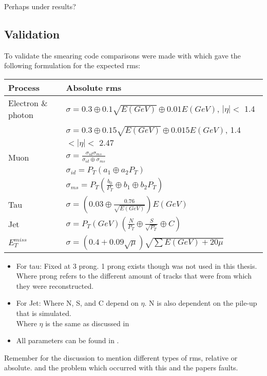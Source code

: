 Perhaps under results?
\subsection{Validation}
To validate the smearing code comparisons were made with \citep{ATL-PHYS-PUB-2013-004} which gave the following formulation for the expected rms: 
\begin{table}[h]
\renewcommand{\arraystretch}{1.5} %
\begin{tabular}{|l|l|}
\hline
Process & Absolute rms \\ \hline
Electron \& photon & $\sigma=0.3\oplus 0.1\sqrt{E(GeV)}\oplus 0.01E(GeV)$, $|\eta|<$ 1.4 \\
& $\sigma=0.3\oplus 0.15\sqrt{E(GeV)}\oplus 0.015E(GeV)$, 1.4 $<|\eta|<$ 2.47 \\ \hline 
Muon & $\sigma=\frac{\sigma_{id} \sigma_{ms}}{\sigma_{id} \oplus \sigma_{ms}}$\\
& $\sigma_{id}=P_T(a_1 \oplus a_2 P_T)$\\
& $\sigma_{ms}=P_T(\frac{b_0}{P_T} \oplus b_1 \oplus b_2 P_T)$\\ \hline
Tau & $\sigma =(0.03\oplus \frac{0.76}{\sqrt{E(GeV)}})E(GeV)$ \\ \hline
Jet & $\sigma = P_T(GeV)(\frac{N}{P_T} \oplus \frac{S}{\sqrt{P_T}} \oplus C)$ \\ \hline
$E_T^{miss}$ & $\sigma = (0.4+0.09\sqrt{\mu})\sqrt{\sum E(GeV)+20\mu}$ \\ \hline
\end{tabular}
\renewcommand{\arraystretch}{1.0} %
\end{table}
\begin{itemize}
\item For tau: Fixed at 3 prong. 1 prong exists though was not used in this thesis. \\
Where prong refers to the different amount of tracks that were from which they were reconstructed.
\item For Jet: Where N, S, and C depend on $\eta$. N is also dependent on the pile-up that is simulated.\\
Where $\eta$ is the same as discussed in 
\item All parameters can be found in \citep{ATL-PHYS-PUB-2013-004}.
\end{itemize}

Remember for the discussion to mention different types of rms, relative or absolute. and the problem which occurred with this and the papers faults.


